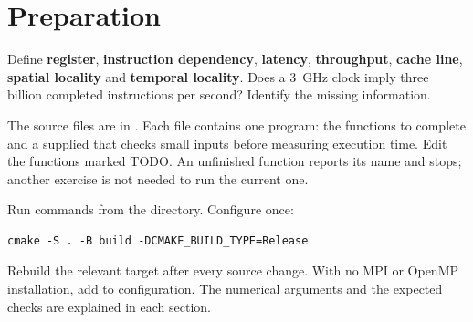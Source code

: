 \section{Preparation}
Define \textbf{register}, \textbf{instruction dependency}, \textbf{latency},
\textbf{throughput}, \textbf{cache line}, \textbf{spatial locality} and
\textbf{temporal locality}. Does a 3~GHz clock imply three billion completed
instructions per second? Identify the missing information.

The source files are in . Each file contains
one program: the functions to complete and a supplied  that checks
small inputs before measuring execution time. Edit the functions marked TODO.
An unfinished function reports its name and stops; another exercise is not needed
to run the current one.

Run commands from the  directory. Configure once:
\begin{lstlisting}[style=shell]
cmake -S . -B build -DCMAKE_BUILD_TYPE=Release
\end{lstlisting}
Rebuild the relevant target after every source change. With no MPI or OpenMP
installation, add  to configuration.
The numerical arguments and the expected checks are explained in each section.

